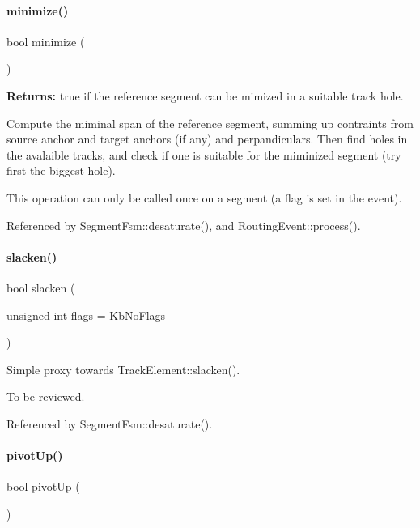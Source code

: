 \paragraph{\texorpdfstring{minimize()}{minimize()}}
{\footnotesize\ttfamily bool minimize (\begin{DoxyParamCaption}{ }\end{DoxyParamCaption})}

{\bfseries Returns\+:} true if the reference segment can be mimized in a suitable track hole.

Compute the miminal span of the reference segment, summing up contraints from source anchor and target anchors (if any) and perpandiculars. Then find holes in the avalaible tracks, and check if one is suitable for the miminized segment (try first the biggest hole).

This operation can only be called once on a segment (a flag is set in the event). 

Referenced by Segment\+Fsm\+::desaturate(), and Routing\+Event\+::process().

\mbox{\label{classKite_1_1Manipulator_a82897c077e4c0d4281c3dce3e37ab997}} 
\paragraph{\texorpdfstring{slacken()}{slacken()}}
{\footnotesize\ttfamily bool slacken (\begin{DoxyParamCaption}\item[{unsigned int}]{flags = {\ttfamily KbNoFlags} }\end{DoxyParamCaption})}

Simple proxy towards Track\+Element\+::slacken().

To be reviewed. 

Referenced by Segment\+Fsm\+::desaturate().

\mbox{\label{classKite_1_1Manipulator_ad590137c4e7e8d5ad2a6f510e0d70e81}} 
\paragraph{\texorpdfstring{pivot\+Up()}{pivotUp()}}
{\footnotesize\ttfamily bool pivot\+Up (\begin{DoxyParamCaption}{ }\end{DoxyParamCaption})}

